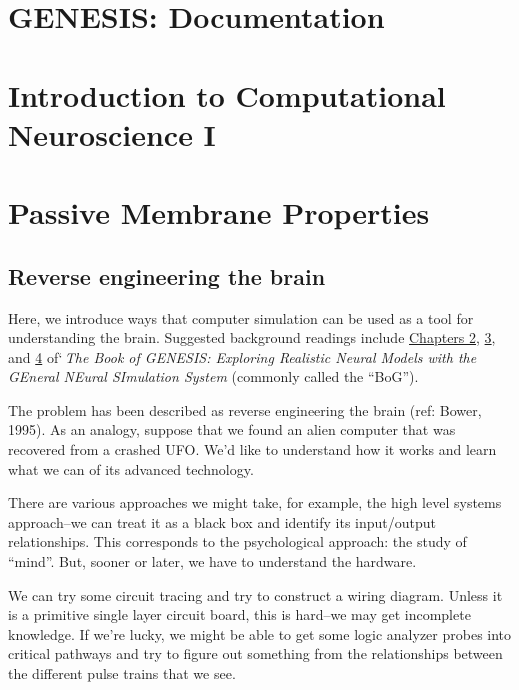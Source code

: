 \documentclass[12pt]{article}
\begin{document}
\section*{GENESIS: Documentation}

\section*{Introduction to Computational Neuroscience I}

\section*{Passive Membrane Properties}

\subsection*{Reverse engineering the brain}

Here, we introduce ways that computer simulation can be used as a tool for understanding the brain. Suggested background readings include \href{../bog-ch2/bog-ch2.pdf}{Chapters 2}, \href{../bog-ch3/bog-ch3.pdf}{3}, and \href{../bog-ch4/bog-ch4.pdf}{4} of`{\it\,The Book of GENESIS: Exploring Realistic Neural Models with the GEneral NEural SImulation System} (commonly called the ``BoG''). 

The problem has been described as reverse engineering the brain (ref: Bower, 1995). As an analogy, suppose that we found an alien computer that was recovered from a crashed UFO. We'd like to understand how it works and learn what we can of its advanced technology.

There are various approaches we might take, for example, the high level systems approach--we can treat it as a black box and identify its input/output relationships. This corresponds to the psychological approach: the study of ``mind''. But, sooner or later, we have to understand the hardware.

We can try some circuit tracing and try to construct a wiring diagram. Unless it is a primitive single layer circuit board, this is hard--we may get incomplete knowledge. If we're lucky, we might be able to get some logic analyzer probes into critical pathways and try to figure out something from the relationships between the different pulse trains that we see.
\end{document}
